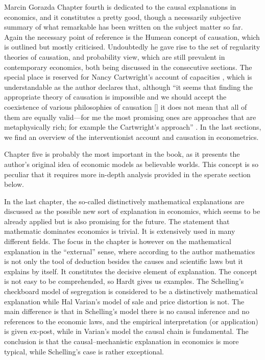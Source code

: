 \begin{recengenv}{Marcin Gorazda}
Chapter fourth is dedicated to the causal explanations in economics, and it constitutes a pretty good, though a
necessarily subjective summary of what remarkable has been written on the subject matter so far. Again the necessary
point of reference is the Humean concept of causation, which is outlined but mostly criticised. Undoubtedly he gave
rise to the set of regularity theories of causation, and probability view, which are still prevalent in contemporary
economics, both being discussed in the consecutive sections. The special place is reserved for Nancy Cartwright’s
account of capacities
\parencite*{cartwright_dappled_1999},
which is understandable as the author declares that,
although ``\mydots it seems that finding the appropriate theory of causation is impossible and we should accept the coexistence
of various philosophies of causation [\mydots] it does not mean that all of them are equally valid—for me the most
promising ones are approaches that are metaphysically rich; for example the Cartwright’s approach''
\parencite[p.118]{hardt_economics_2017}.
In the last sections, we find an overview of the interventionist account
and causation in econometrics. 

Chapter five is probably the most important in the book, as it presents the author’s original idea of economic models as
believable worlds. This concept is so peculiar that it requires more in-depth analysis provided in the sperate section
below.


In the last chapter, the so-called distinctively mathematical explanations are discussed as the possible new sort of
explanation in economics, which seems to be already applied but is also promising for the future. The statement that
mathematic dominates economics is trivial. It is extensively used in many different fields. The focus in the chapter is
however on the mathematical explanation in the ``external'' sense, where according to the author mathematics is not only
the tool of deduction besides the causes and scientific laws but it explains by itself. It constitutes the decisive
element of explanation. The concept is not easy to be comprehended, so Hardt gives us examples. The Schelling’s
checkboard model of segregation is considered to be a distinctively mathematical explanation while Hal Varian’s model
of sale and price distortion is not. The main difference is that in Schelling’s model there is no causal inference and
no references to the economic laws, and the empirical interpretation (or application) is given ex-post, while in
Varian’s model the causal chain is fundamental. The conclusion is that the causal–mechanistic explanation in economics
is more typical, while Schelling’s case is rather exceptional. 


\end{recengenv}
